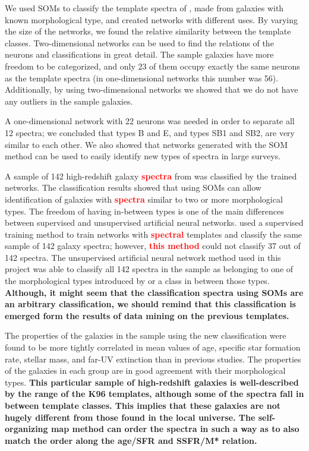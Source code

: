 \documentclass[useAMS,usenatbib]{mn2e}
\begin{document}
We used SOMs to classify the template spectra of , made from galaxies with known morphological type, and created networks with different uses.
By varying the size of the networks, we found the relative similarity between the  template classes.
Two-dimensional networks can be used to find the relations of the neurons and classifications in great detail.
The sample galaxies have more freedom to be categorized, and only 23 of them occupy exactly the same neurons as the  template spectra (in one-dimensional networks this number was 56).
Additionally, by using two-dimensional networks we showed that we do not have any outliers in the sample galaxies.

A one-dimensional network with 22 neurons was needed in order to
separate all 12  spectra; we concluded that  types B and E, and types SB1 and SB2, are very similar to each other.
We also showed that networks generated with the SOM method can be used to easily identify new types of spectra in large surveys.

A sample of 142 high-redshift galaxy \textbf{\textcolor{red}{spectra}} from  was classified by the trained networks.
The classification results showed that using SOMs can allow identification of galaxies with \textbf{\textcolor{red}{spectra}} similar to two or more morphological types.
The freedom of having in-between types is one of the main differences between supervised and unsupervised artificial neural networks.
 used a supervised training method to train networks with  \textbf{\textcolor{red}{spectral}} templates and classify the same sample of 142 galaxy spectra;
however, \textbf{\textcolor{red}{this method}} could not classify 37 out of 142 spectra.
The unsupervised artificial neural network method used in this project was able to classify  all 142 spectra in the sample
as belonging to one of the morphological types introduced by  or a class in between those types.
\textbf{Although, it might seem that the classification spectra using SOMs are an arbitrary classification, we should remind that this classification is emerged form the results of data mining on the previous templates.}

The properties of the galaxies in the  sample using the new classification were found to be more tightly correlated in mean values of age, specific star formation rate, stellar mass, and far-UV extinction than in previous studies. 
The properties of the galaxies in each group are in good agreement with their morphological types.
\textbf{This particular sample of high-redshift galaxies is well-described by the range of the K96 templates, although some of the spectra fall in between template classes. 
This implies that these galaxies are not hugely different from those found in the local universe.
The self-organizing map method can order the spectra in such a way as to also match the order along the age/SFR and SSFR/M* relation.}
\end{document}
